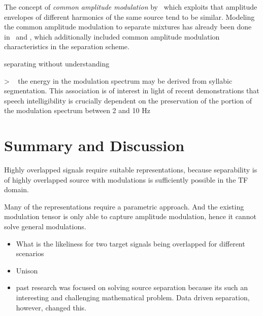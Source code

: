 The concept of \emph{common amplitude modulation} by~\cite{bregman, wang06} which exploits that amplitude envelopes of different harmonics of the same source tend to be similar.
Modeling the common amplitude modulation to separate mixtures has already been done in~\cite{li07} and \cite{cano14}, which additionally included common amplitude modulation characteristics in the separation scheme.

separating without understanding

> ~\cite{greenberg96} the energy in the modulation spectrum may be derived from syllabic segmentation. This association is of interest in light of recent demonstrations that speech intelligibility is crucially dependent on the preservation of the portion of the modulation spectrum between 2 and 10 Hz

\section{Summary and Discussion}



Highly overlapped signals require suitable representations, because separability is of highly overlapped source with modulations is sufficiently possible in the TF domain.

Many of the representations require a parametric approach. And the existing modulation tensor is only able to capture amplitude modulation, hence it cannot solve general modulations.

\begin{itemize}
  \item What is the likeliness for two target signals being overlapped for different scenarios
  \item Unison
  \item past research was focused on solving source separation because its such an interesting and challenging mathematical problem. Data driven separation, however, changed this.
\end{itemize}
